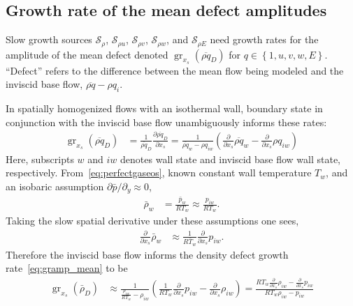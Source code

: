 \documentclass[letterpaper,11pt,nointlimits,reqno,draft]{amsbook}
\newcommand{\Ssd}{\ensuremath{\mathcal{S}}} %
\begin{document}
\subsection{Growth rate of the mean defect amplitudes}
\label{sec:slowgrowthgramp_mean}

Slow growth sources $\Ssd_\rho$, $\Ssd_{\rho u}$, $\Ssd_{\rho v}$, $\Ssd_{\rho
w}$, and $\Ssd_{\rho E}$ need growth rates for the amplitude of the mean defect
denoted $\operatorname{gr}_{x_s}\!\left(\overline{\rho q}_{D}\right)$ for
$q\in\left\{1,u,v,w,E\right\}$.  ``Defect'' refers to the difference between the
mean flow being modeled and the inviscid base flow, $\overline{\rho q} - {\rho
q}_i$.

In spatially homogenized flows with an isothermal wall, boundary state in
conjunction with the inviscid base flow unambiguously informs these rates:
\begin{align}
    \label{eq:gramp_mean}
    \operatorname{gr}_{x_s}\!\left(\overline{\rho q}_{D}\right)
    &=
    \frac{1}{\overline{\rho q}_{D}}
    \frac{\partial \overline{\rho q}_D}{\partial x_s}
    =
    \frac{1}{\overline{\rho q}_{w} - {\rho q}_{iw}}
    \left(
          \frac{\partial}{\partial x_s} \overline{\rho q}_{w}
        - \frac{\partial}{\partial x_s}          {\rho q}_{iw}
    \right)
\end{align}
Here, subscripts $w$ and $iw$ denotes wall state and inviscid base flow wall
state, respectively.  From~\eqref{eq:perfectgaseos}, known constant wall
temperature $T_w$, and an isobaric assumption $\partial \bar{p} / \partial_y
\approx 0$,
\begin{align}
    \bar{\rho}_w
    &= \frac{\bar{p}_{ w}}{R T_w}
    \approx \frac{p_{iw}}{R T_w}.
\end{align}
Taking the slow spatial derivative under these assumptions one sees,
\begin{align}
    \frac{\partial}{\partial x_s} \bar{\rho}_w
    &\approx \frac{1}{R \bar{T}_w} \frac{\partial}{\partial x_s} p_{iw}.
\end{align}
Therefore the inviscid base flow informs the density defect growth
rate~\eqref{eq:gramp_mean} to be
\begin{align}
    \operatorname{gr}_{x_s}\!\left(\bar{\rho}_{D}\right)
    &\approx
    \frac{1}{\frac{p_{iw}}{R T_w} - {\rho}_{iw}}
    \left(
          \frac{1}{R T_w} \frac{\partial}{\partial x_s} {p   }_{iw}
        -                 \frac{\partial}{\partial x_s} {\rho}_{iw}
    \right)
    =
    \frac{
          R T_w \frac{\partial}{\partial x_s} \rho_{iw}
        -       \frac{\partial}{\partial x_s}    p_{iw}
    }{
          {R T_w} \rho_{iw} - p_{iw}
    }
\end{align}
\end{document}
